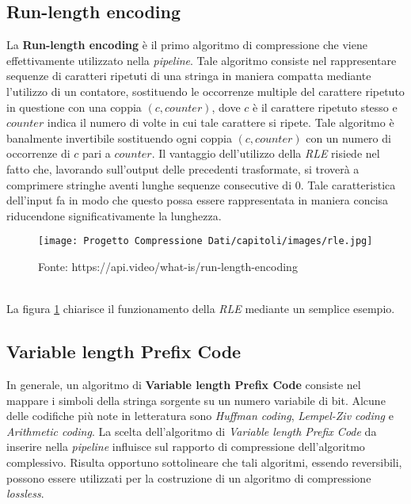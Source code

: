 \begin{enumerate}
\subsection{Run-length encoding} 
La \textbf{Run-length encoding} è il primo algoritmo di compressione che viene effettivamente utilizzato nella \emph{pipeline}. Tale algoritmo consiste nel rappresentare sequenze di caratteri ripetuti di una stringa in maniera compatta mediante l'utilizzo di un contatore, sostituendo le occorrenze multiple del carattere ripetuto in questione con una coppia $(c, counter)$, dove $c$ è il carattere ripetuto stesso e $counter$ indica il numero di volte in cui tale carattere si ripete. Tale algoritmo è banalmente invertibile sostituendo ogni coppia $(c, counter)$ con un numero di occorrenze di $c$ pari a $counter$. Il vantaggio dell'utilizzo della \emph{RLE} risiede nel fatto che, lavorando sull'output delle precedenti trasformate, si troverà a comprimere stringhe aventi lunghe sequenze consecutive di $0$. Tale caratteristica dell'input fa in modo che questo possa essere rappresentata in maniera concisa riducendone significativamente la lunghezza.  
\begin{figure}[h]
    \centering
    \texttt{[image: Progetto Compressione Dati/capitoli/images/rle.jpg]}
\caption{Fonte: https://api.video/what-is/run-length-encoding}
    \label{fig:rle}
\end{figure} \\
La figura \ref{fig:rle} chiarisce il funzionamento della \emph{RLE} mediante un semplice esempio.
\subsection{Variable length Prefix Code} 
In generale, un algoritmo di \textbf{Variable length Prefix Code} consiste nel mappare i simboli della stringa sorgente su un numero variabile di bit. Alcune delle codifiche più note in letteratura sono \emph{Huffman coding}, \emph{Lempel-Ziv coding} e \emph{Arithmetic coding}. La scelta dell'algoritmo di \emph{Variable length Prefix Code} da inserire nella \emph{pipeline} influisce sul rapporto di compressione dell'algoritmo complessivo. Risulta opportuno sottolineare che tali algoritmi, essendo reversibili, possono essere utilizzati per la costruzione di un algoritmo di compressione \emph{lossless}.  

\end{enumerate}
